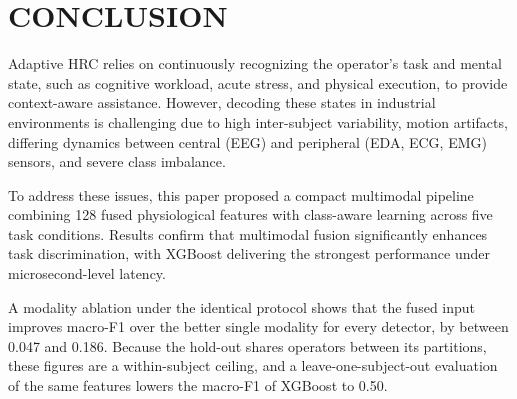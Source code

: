 \documentclass[a4paper,twoside]{article}
\begin{document}

\section{\uppercase{Conclusion}}\label{sec:conclusion}

\noindent Adaptive \ac{HRC} relies on continuously recognizing the operator's task and mental state, such as cognitive workload, acute stress, and physical execution, to provide context-aware assistance. However, decoding these states in industrial environments is challenging due to high inter-subject variability, motion artifacts, differing dynamics between central (\ac{EEG}) and peripheral (\ac{EDA}, \ac{ECG}, \ac{EMG}) sensors, and severe class imbalance. 

To address these issues, this paper proposed a compact multimodal pipeline combining 128 fused physiological features with class-aware learning across five task conditions. Results confirm that multimodal fusion significantly enhances task discrimination, with \ac{XGBoost} delivering the strongest performance under microsecond-level latency.

A modality ablation under the identical protocol shows that the fused input improves macro-F1 over the better single modality for every detector, by between 0.047 and 0.186. Because the hold-out shares operators between its partitions, these figures are a within-subject ceiling, and a leave-one-subject-out evaluation of the same features lowers the macro-F1 of \ac{XGBoost} to 0.50.
\end{document}
